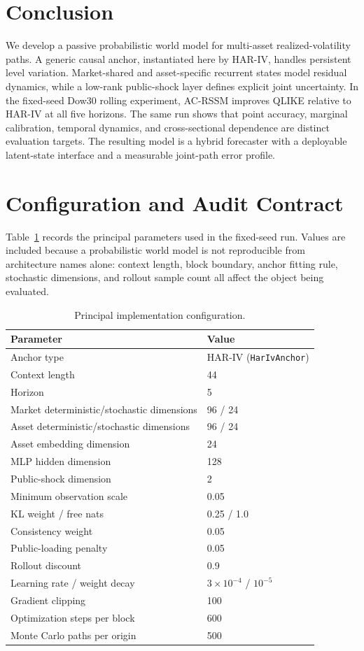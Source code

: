 \documentclass[11pt]{article}
\begin{document}
\section{Conclusion}
We develop a passive probabilistic world model for multi-asset realized-volatility paths. A generic causal anchor, instantiated here by HAR-IV, handles persistent level variation. Market-shared and asset-specific recurrent states model residual dynamics, while a low-rank public-shock layer defines explicit joint uncertainty. In the fixed-seed Dow30 rolling experiment, AC-RSSM improves QLIKE relative to HAR-IV at all five horizons. The same run shows that point accuracy, marginal calibration, temporal dynamics, and cross-sectional dependence are distinct evaluation targets. The resulting model is a hybrid forecaster with a deployable latent-state interface and a measurable joint-path error profile.

\appendix
\section{Configuration and Audit Contract}
Table~\ref{tab:config} records the principal parameters used in the fixed-seed run. Values are included because a probabilistic world model is not reproducible from architecture names alone: context length, block boundary, anchor fitting rule, stochastic dimensions, and rollout sample count all affect the object being evaluated.
\begin{table}[h]
\centering
\caption{Principal implementation configuration.}
\label{tab:config}
\small
\begin{tabular}{ll}
\toprule
Parameter & Value\\
\midrule
Anchor type & HAR-IV (\texttt{HarIvAnchor})\\
Context length & 44\\
Horizon & 5\\
Market deterministic/stochastic dimensions & 96 / 24\\
Asset deterministic/stochastic dimensions & 96 / 24\\
Asset embedding dimension & 24\\
MLP hidden dimension & 128\\
Public-shock dimension & 2\\
Minimum observation scale & 0.05\\
KL weight / free nats & 0.25 / 1.0\\
Consistency weight & 0.05\\
Public-loading penalty & 0.05\\
Rollout discount & 0.9\\
Learning rate / weight decay & $3\times10^{-4}$ / $10^{-5}$\\
Gradient clipping & 100\\
Optimization steps per block & 600\\
Monte Carlo paths per origin & 500\\
\bottomrule
\end{tabular}
\end{table}
\end{document}
